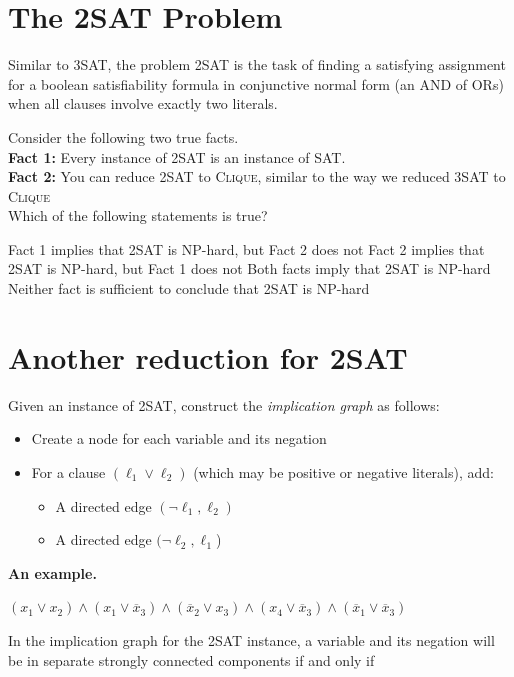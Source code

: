 \documentclass[11  pt]{article}
\begin{document}
\newpage

\section{The 2SAT Problem}
Similar to 3SAT, the problem 2SAT is the task of finding a satisfying assignment for a boolean satisfiability formula in conjunctive normal form (an AND of ORs) when all clauses involve exactly two literals. \\


\vspace{3cm}


\begin{Qu}
	Consider the following two true facts. \\
	
	\textbf{Fact 1:} Every instance of 2SAT is an instance of SAT. \\
	
	\textbf{Fact 2:} You can reduce 2SAT to \textsc{Clique}, similar to the way we reduced 3SAT to \textsc{Clique}\\
	
	Which of the following statements is true?
	\begin{itemize}
		\aitem Fact 1 implies that 2SAT is NP-hard, but Fact 2 does not
		\bitem Fact 2 implies that 2SAT is NP-hard, but Fact 1 does not
		\citem Both facts imply that 2SAT is NP-hard
		\ditem Neither fact is sufficient to conclude that 2SAT is NP-hard
	\end{itemize}	
\end{Qu}


\newpage
\section{Another reduction for 2SAT}

Given an instance of 2SAT, construct the \emph{implication graph} as follows:
\begin{itemize}
	\item Create a node for each variable and its negation
	\item For a clause $(\ell_1 \lor \ell_2)$ (which may be positive or negative literals), add:
	\begin{itemize}
		\item A directed edge $(\neg \ell_1, \ell_2)$
		\item A directed edge $(\neg \ell_2, \ell_1$)
	\end{itemize}
\end{itemize}

\textbf{An example.}

\begin{center}
 {\Large $(x_1 \lor x_2) \land (x_1 \lor \overline{x}_3) \land (\overline{x}_2 \lor x_3) \land (x_4 \lor \overline{x}_3) \land (\overline{x}_1 \lor \overline{x}_3)$}
 \end{center}
\vs{4cm}

\newpage
\begin{theorem}
	In the implication graph for the 2SAT instance, a variable and its negation will be in separate strongly connected components if and only if %
\end{theorem}
\end{document}
